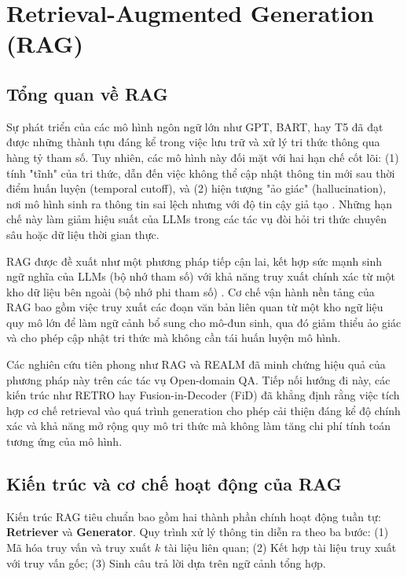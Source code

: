 \section{Retrieval-Augmented Generation (RAG)}

\subsection{Tổng quan về RAG}

Sự phát triển của các mô hình ngôn ngữ lớn như GPT, BART, hay T5 đã đạt được những thành tựu đáng kể trong việc lưu trữ và xử lý tri thức thông qua hàng tỷ tham số. Tuy nhiên, các mô hình này đối mặt với hai hạn chế cốt lõi: (1) tính "tĩnh" của tri thức, dẫn đến việc không thể cập nhật thông tin mới sau thời điểm huấn luyện (temporal cutoff), và (2) hiện tượng "ảo giác" (hallucination), nơi mô hình sinh ra thông tin sai lệch nhưng với độ tin cậy giả tạo \cite{https://arxiv.org/pdf/2507.18910v1}. Những hạn chế này làm giảm hiệu suất của LLMs trong các tác vụ đòi hỏi tri thức chuyên sâu hoặc dữ liệu thời gian thực.

RAG được đề xuất như một phương pháp tiếp cận lai, kết hợp sức mạnh sinh ngữ nghĩa của LLMs (bộ nhớ tham số) với khả năng truy xuất chính xác từ một kho dữ liệu bên ngoài (bộ nhớ phi tham số) \cite{lewis2020rag, guu2020realm}. Cơ chế vận hành nền tảng của RAG bao gồm việc truy xuất các đoạn văn bản liên quan từ một kho ngữ liệu quy mô lớn để làm ngữ cảnh bổ sung cho mô-đun sinh, qua đó giảm thiểu ảo giác và cho phép cập nhật tri thức mà không cần tái huấn luyện mô hình.

Các nghiên cứu tiên phong như RAG \cite{lewis2020rag} và REALM \cite{guu2020realm} đã minh chứng hiệu quả của phương pháp này trên các tác vụ Open-domain QA. Tiếp nối hướng đi này, các kiến trúc như RETRO \cite{borgeaud2022retro} hay Fusion-in-Decoder (FiD) \cite{izacard2021fid} đã khẳng định rằng việc tích hợp cơ chế retrieval vào quá trình generation cho phép cải thiện đáng kể độ chính xác và khả năng mở rộng quy mô tri thức mà không làm tăng chi phí tính toán tương ứng của mô hình.

\subsection{Kiến trúc và cơ chế hoạt động của RAG}
\label{sec:rag_arch}

Kiến trúc RAG tiêu chuẩn bao gồm hai thành phần chính hoạt động tuần tự: \textbf{Retriever} và \textbf{Generator}. Quy trình xử lý thông tin diễn ra theo ba bước: (1) Mã hóa truy vấn và truy xuất $k$ tài liệu liên quan; (2) Kết hợp tài liệu truy xuất với truy vấn gốc; (3) Sinh câu trả lời dựa trên ngữ cảnh tổng hợp.

